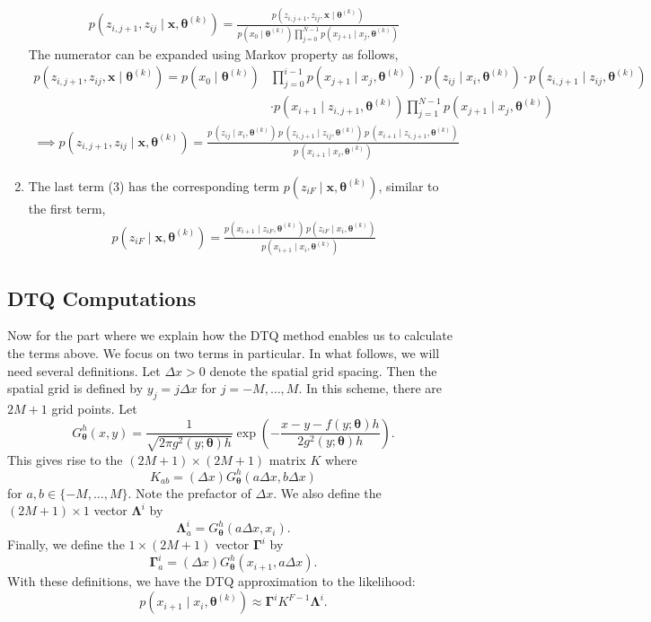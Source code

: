 \documentclass[12pt]{article}
\newcommand{\bx}{\ensuremath{\mathbf{x}}}
\newcommand{\btheta}{\ensuremath{\boldsymbol{\theta}}}
\newcommand{\bLambda}{\ensuremath{\boldsymbol{\Lambda}}}
\newcommand{\bGamma}{\ensuremath{\boldsymbol{\Gamma}}}
\begin{document}
\begin{enumerate}
\begin{align}
p(z_{i,j+1}, z_{ij} \mid \bx, \btheta^{(k)}) = \frac{p(z_{i,j+1}, z_{ij}, \bx \mid \btheta^{(k)})}{p(x_0 \mid \btheta^{(k)}) \prod_{j=0}^{N-1} p(x_{j+1} \mid x_{j}, \btheta^{(k)})}
\end{align}
The numerator can be expanded using Markov property as follows,
\begin{align}
p(z_{i,j+1}, z_{ij}, \bx \mid \btheta^{(k)}) = p(x_0 \mid \btheta^{(k)}) & \prod_{j=0}^{i-1} p(x_{j+1} \mid x_j, \btheta^{(k)}) \cdot p(z_{ij} \mid x_i, \btheta^{(k)}) \cdot p(z_{i,j+1} \mid z_{ij}, \btheta^{(k)}) \nonumber \\
& \cdot p(x_{i+1} \mid z_{i,j+1}, \btheta^{(k)}) \prod_{j=1}^{N-1} p(x_{j+1} \mid x_{j}, \btheta^{(k)}) \end{align}
\begin{align}
\implies p(z_{i,j+1}, z_{ij} \mid \bx, \btheta^{(k)}) = \frac{p \, (z_{ij} \mid x_i, \btheta^{(k)}) \, p \, (z_{i,j+1} \mid z_{ij}, \btheta^{(k)}) \, p \, (x_{i+1} \mid z_{i,j+1}, \btheta^{(k)})}{p \, (x_{i+1} \mid x_{i}, \btheta^{(k)})}
\end{align}
\item The last term (3) has the corresponding term $p(z_{iF} \mid \bx, \btheta^{(k)})$, similar to the first term,
\begin{align}
p(z_{iF} \mid \bx, \btheta^{(k)}) = \frac{p(x_{i+1} \mid z_{iF}, \btheta^{(k)}) \, p(z_{iF} \mid x_{i}, \btheta^{(k)})}{p(x_{i+1} \mid x_{i}, \btheta^{(k)})}
\end{align}
\end{enumerate}

\subsection{DTQ Computations}
Now for the part where we explain how the DTQ method enables us to calculate the terms above.  We focus on two terms in particular.  In what follows, we will need several definitions.  Let $\Delta x > 0$ denote the spatial grid spacing. Then the spatial grid is defined by $y_j = j \Delta x$ for $j = -M, \ldots, M$.  In this scheme, there are $2M+1$ grid points.  Let
$$
G^h_{\btheta}(x,y) = \frac{1}{\sqrt{2 \pi g^2(y; \btheta) h}} \exp \left( -\frac{ x - y - f(y;\btheta) h}{2 g^2(y; \btheta) h} \right).
$$
This gives rise to the $(2M+1) \times (2M+1)$ matrix $K$ where
$$
K_{ab} = (\Delta x) G^h_{\btheta}(a \Delta x, b \Delta x)
$$
for $a, b \in \{-M, \ldots, M\}$.  Note the prefactor of $\Delta x$.  We also define the $(2M+1) \times 1$ vector $\bLambda^i$ by 
$$
\bLambda^i_a = G^h_{\btheta}(a \Delta x, x_i).
$$
Finally, we define the $1 \times (2M+1)$ vector $\bGamma^i$ by
$$
\bGamma^i_a = (\Delta x) G^h_{\btheta}( x_{i+1}, a \Delta x ).
$$
With these definitions, we have the DTQ approximation to the likelihood:
$$
p(x_{i+1} \mid x_i, \btheta^{(k)}) \approx \bGamma^i K^{F-1} \bLambda^i.
$$
\end{document}
